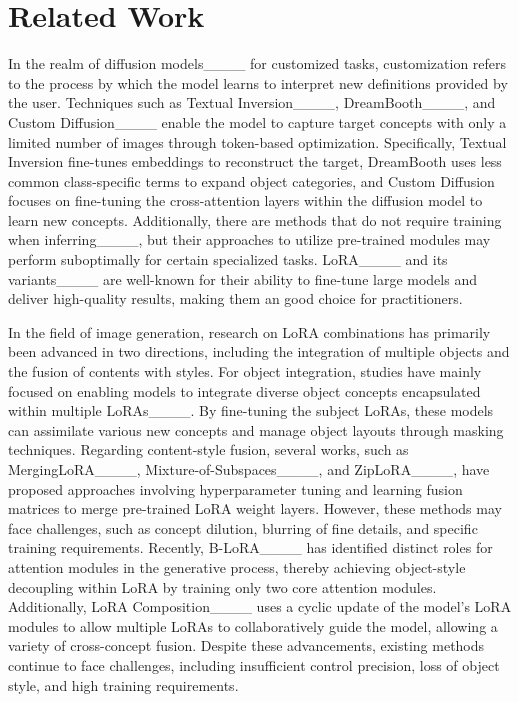 \section{Related Work}
\label{sec:relatedwork}

 In the realm of diffusion models____ for customized tasks, customization refers to the process by which the model learns to interpret new definitions provided by the user.
%
Techniques such as Textual Inversion____, DreamBooth____, and Custom Diffusion____ enable the model to capture target concepts with only a limited number of images through token-based optimization. 
%
Specifically, Textual Inversion fine-tunes embeddings to reconstruct the target, DreamBooth uses less common class-specific terms to expand object categories, and Custom Diffusion focuses on fine-tuning the cross-attention layers within the diffusion model to learn new concepts. 
%
Additionally, there are methods that do not require training 
when inferring____, but their approaches to utilize pre-trained modules may perform suboptimally for certain specialized tasks.
%
LoRA____ and its variants____ are well-known for their ability to fine-tune large models and deliver high-quality results, making them an good choice for practitioners.


 In the field of image generation, research on LoRA combinations has primarily been advanced in two directions, including the integration of multiple objects and the fusion of contents with styles.
%
For object integration, studies have mainly focused on enabling models to integrate diverse object concepts encapsulated within multiple LoRAs____. 
%
By fine-tuning the subject LoRAs, these models can assimilate various new concepts and manage object layouts through masking techniques. 
%
Regarding content-style fusion, several works, such as MergingLoRA____, Mixture-of-Subspaces____, and ZipLoRA____, have proposed approaches involving hyperparameter tuning and learning fusion matrices to merge pre-trained LoRA weight layers.
%
However, these methods may face challenges, such as concept dilution, blurring of fine details, and specific training requirements. 
%
Recently, B-LoRA____ has identified distinct roles for attention modules in the generative process, thereby achieving object-style decoupling within LoRA by training only two core attention modules. 
%
Additionally, LoRA Composition____ uses a cyclic update of the model's LoRA modules to allow multiple LoRAs to collaboratively guide the model, allowing a variety of cross-concept fusion. 
%
Despite these advancements, existing methods continue to face challenges, including insufficient control precision, loss of object style, and high training requirements.